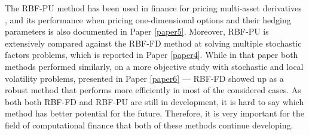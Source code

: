 \documentclass{UUThesisTemplate}
\begin{document}
\par The RBF-PU method has been used in finance for pricing multi-asset derivatives \cite{shcherbakov2016radialvanilla, shcherbakov2016radial}, and its performance when pricing one-dimensional options and their hedging parameters is also documented in Paper \ref{paper5}. Moreover, RBF-PU is extensively compared against the RBF-FD method at solving multiple stochastic factors problems, which is reported in Paper \ref{paper4}. While in that paper both methods performed similarly, on a more objective study with stochastic and local volatility problems, presented in Paper \ref{paper6} --- RBF-FD showed up as a robust method that performs more efficiently in most of the considered cases. As both both RBF-FD and RBF-PU are still in development, it is hard to say which method has better potential for the future. Therefore, it is very important for the field of computational finance that both of these methods continue developing.
%
\end{document}
